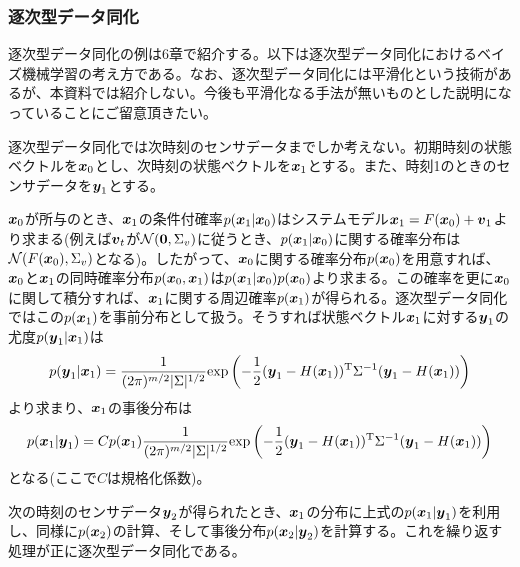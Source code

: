 \documentclass[dvipdfmx, 9pt, a4paper]{jsarticle}
\newcommand{\bm}[1]{{\mbox{\boldmath $#1$}}}
\begin{document}
\subsubsection{逐次型データ同化}
逐次型データ同化の例は6章で紹介する。以下は逐次型データ同化におけるベイズ機械学習の考え方である。なお、逐次型データ同化には平滑化という技術があるが、本資料では紹介しない。今後も平滑化なる手法が無いものとした説明になっていることにご留意頂きたい。\par
逐次型データ同化では次時刻のセンサデータまでしか考えない。初期時刻の状態ベクトルを$\bm x_0$とし、次時刻の状態ベクトルを$\bm x_1$とする。また、時刻1のときのセンサデータを$\bm y_1$とする。\par
$\bm x_0$が所与のとき、$\bm x_1$の条件付確率$p(\bm x_1|\bm x_0)$はシステムモデル$\bm x_1=F(\bm x_0)+\bm v_1$より求まる(例えば$\bm v_t$が$\mathcal{N}(\bm 0, \Sigma_v)$に従うとき、$p(\bm x_1|\bm x_0)$に関する確率分布は$\mathcal{N}(F(\bm x_0), \Sigma_v)$となる)。したがって、$\bm x_0$に関する確率分布$p(\bm x_0)$を用意すれば、$\bm x_0$と$\bm x_1$の同時確率分布$p(\bm x_0, \bm x_1)$は$p(\bm x_1|\bm x_0)p(\bm x_0)$より求まる。この確率を更に$\bm x_0$に関して積分すれば、$\bm x_1$に関する周辺確率$p(\bm x_1)$が得られる。逐次型データ同化ではこの$p(\bm x_1)$を事前分布として扱う。そうすれば状態ベクトル$\bm x_1$に対する$\bm y_1$の尤度$p(\bm y_1|\bm x_1)$は
\begin{equation}
p(\bm y_1|\bm x_1)=\frac{1}{(2\pi)^{m/2}|\Sigma|^{1/2}}{\rm exp}\left(
-\frac{1}{2}(\bm y_1-H(\bm x_1))^{\rm T}\Sigma^{-1}(\bm y_1-H(\bm x_1))
\right) \notag
\end{equation}
より求まり、$\bm x_1$の事後分布は
\begin{equation}
p(\bm x_1|\bm y_1)=Cp(\bm x_1)\frac{1}{(2\pi)^{m/2}|\Sigma|^{1/2}}{\rm exp}\left(
-\frac{1}{2}(\bm y_1-H(\bm x_1))^{\rm T}\Sigma^{-1}(\bm y_1-H(\bm x_1))
\right) \notag
\end{equation}
となる(ここで$C$は規格化係数)。\par
次の時刻のセンサデータ$\bm y_2$が得られたとき、$\bm x_1$の分布に上式の$p(\bm x_1|\bm y_1)$を利用し、同様に$p(\bm x_2)$の計算、そして事後分布$p(\bm x_2|\bm y_2)$を計算する。これを繰り返す処理が正に逐次型データ同化である。
\end{document}
